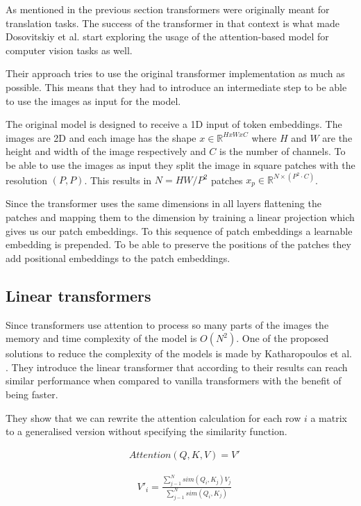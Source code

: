 As mentioned in the previous section transformers were originally meant for translation tasks. The success of the transformer in that context is what made Dosovitskiy et al. \cite{dosovitskiy_image_2021} start exploring the usage of the attention-based model for computer vision tasks as well.

Their approach tries to use the original transformer implementation as much as possible. This means that they had to introduce an intermediate step to be able to use the images as input for the model.

The original model is designed to receive a 1D input of token embeddings. The images are 2D and each image has the shape $x \in \mathbb{R}^{H x W x C}$ where $H$ and $W$ are the height and width of the image respectively and $C$ is the number of channels. To be able to use the images as input they split the image in square patches with the resolution $(P, P)$. This results in $N = HW/P^2$ patches $x_p \in \mathbb{R}^{N \times (P^2 \cdot C)}$.

Since the transformer uses the same dimensions in all layers flattening the patches and mapping them to the dimension by training a linear projection which gives us our patch embeddings. To this sequence of patch embeddings a learnable embedding is prepended. To be able to preserve the positions of the patches they add positional embeddings to the patch embeddings.

\subsection{Linear transformers}

Since transformers use attention to process so many parts of the images the memory and time complexity of the model is $O(N^2)$. One of the proposed solutions to reduce the complexity of the models is made by Katharopoulos et al. \cite{katharopoulos_transformers_2020}. They introduce the linear transformer that according to their results can reach similar performance when compared to vanilla transformers with the benefit of being faster. 

They show that we can rewrite the attention calculation for each row $i$ a matrix to a generalised version without specifying the similarity function.

\begin{align}
&Attention(Q, K, V) = V'
\end{align}


\begin{align}
&V'_i =\frac{\sum_{j-1} ^{N} sim(Q_i, K_j) V_j}{\sum_{j-1} ^{N} sim(Q_i, K_j)}
\end{align}

